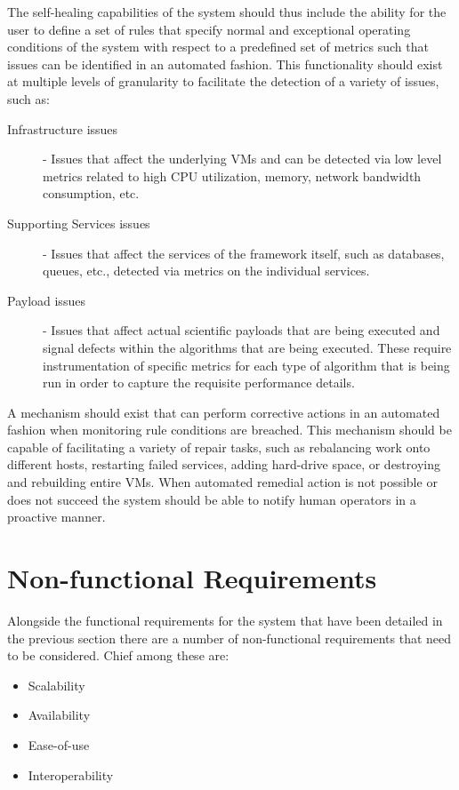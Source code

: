 The self-healing capabilities of the system should thus include the ability for the user to define a set of rules that specify normal and exceptional operating conditions of the system with respect to a predefined set of metrics such that issues can be identified in an automated fashion. This functionality should exist at multiple levels of granularity to facilitate the detection of a variety of issues, such as:

\begin{description}
    \item [Infrastructure issues] - Issues that affect the underlying VMs and can be detected via low level metrics related to high CPU utilization, memory, network bandwidth consumption, etc.
    \item [Supporting Services issues] - Issues that affect the services of the framework itself, such as databases, queues, etc., detected via metrics on the individual services.
    \item [Payload issues] - Issues that affect actual scientific payloads that are being executed and signal defects within the algorithms that are being executed. These require instrumentation of specific metrics for each type of algorithm that is being run in order to capture the requisite performance details.    
\end{description}

A mechanism should exist that can perform corrective actions in an automated fashion when monitoring rule conditions are breached. This mechanism should be capable of facilitating a variety of repair tasks, such as rebalancing work onto different hosts, restarting failed services, adding hard-drive space, or destroying and rebuilding entire VMs. When automated remedial action is not possible or does not succeed the system should be able to notify human operators in a proactive manner.

\section{Non-functional Requirements} \label{sec:non_functional_requirements}

Alongside the functional requirements for the system that have been detailed in the previous section there are a number of non-functional requirements that need to be considered. Chief among these are:

\begin{itemize}
\item Scalability
\item Availability
\item Ease-of-use
\item Interoperability
\end{itemize}

